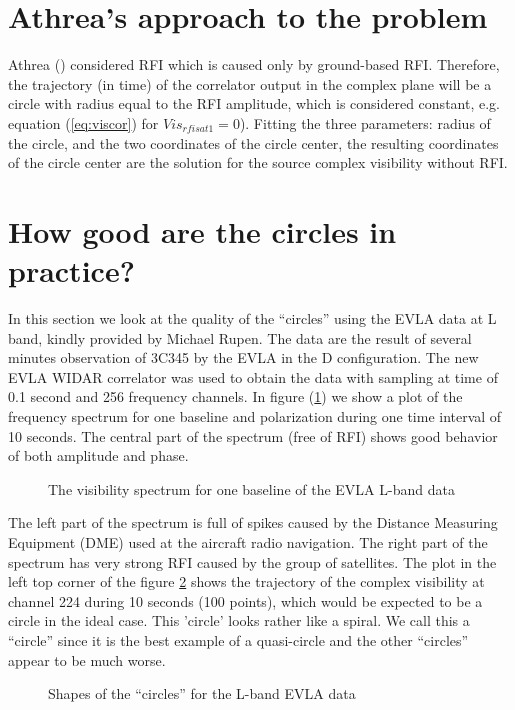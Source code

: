 \documentclass{article}
\def\plotone#1{\centering \leavevmode
                  \epsfysize=7\unitlength \epsfbox{#1} \hfil}
\begin{document}
\section{Athrea's approach to the problem}
Athrea  (\cite{ram}) considered  RFI which is caused only by ground-based RFI.
Therefore, the trajectory (in time) of the  correlator output in the
complex plane will be a circle with radius equal to the RFI
amplitude, which is considered constant, e.g. equation
(\ref{eq:viscor}) for $Vis_{rfisat1}=0$). Fitting the three parameters:
radius of the circle, and the two coordinates of the circle center,
the resulting coordinates of the circle center are the solution for the
source complex visibility without RFI.

\section{How good are the circles in practice?}
In this section we look at the quality of the ``circles'' using the
EVLA data at L band, kindly provided by Michael Rupen. The data are the result
of several minutes  observation of 3C345 by the EVLA in the D
configuration. The
new EVLA WIDAR correlator was used to obtain the data with sampling at time
of 0.1 second and 256 frequency channels.
In figure (\ref{fig:vissp}) we show a plot of the frequency spectrum for one
baseline and polarization during one time interval of 10 seconds. The central
part of the spectrum (free of RFI) shows good behavior of both
amplitude and phase.
\begin{figure}[h]
  \begin{center}
  \plotone {MRUPEN_SPECTR90.EPS}
  \end{center}
 \caption{The visibility spectrum for one baseline of the EVLA L-band
 data}
                  \label{fig:vissp}
\end{figure}
The left part of the spectrum is full of spikes caused by the
Distance Measuring Equipment (DME) used at the aircraft radio navigation. The right part of the spectrum has very strong RFI caused by the
group of satellites.
The plot in the left top corner of the figure \ref{fig:cir} shows the
trajectory of the complex visibility at channel 224 during 10 seconds
(100 points), which would be expected to be a circle in the ideal case. This
'circle' looks rather like a spiral.  We call this  a ``circle'' since it
is the best example of a quasi-circle and the other ``circles'' appear
to be much worse.
\begin{figure}[h]
  \begin{center}
  \end{center}
\caption{Shapes of the ``circles'' for the L-band EVLA data}
\label{fig:cir}
\end{figure}
\end{document}
